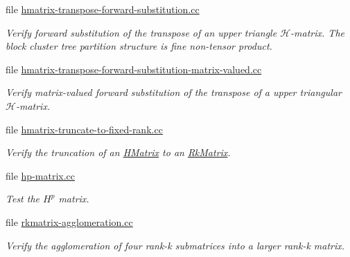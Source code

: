 \begin{DoxyCompactItemize}
file \hyperlink{hmatrix-transpose-forward-substitution_8cc}{hmatrix-\/transpose-\/forward-\/substitution.\+cc}
\begin{DoxyCompactList}\small\item\em Verify forward substitution of the transpose of an upper triangle $\mathcal{H}$-\/matrix. The block cluster tree partition structure is fine non-\/tensor product. \end{DoxyCompactList}\item 
file \hyperlink{hmatrix-transpose-forward-substitution-matrix-valued_8cc}{hmatrix-\/transpose-\/forward-\/substitution-\/matrix-\/valued.\+cc}
\begin{DoxyCompactList}\small\item\em Verify matrix-\/valued forward substitution of the transpose of a upper triangular $\mathcal{H}$-\/matrix. \end{DoxyCompactList}\item 
file \hyperlink{hmatrix-truncate-to-fixed-rank_8cc}{hmatrix-\/truncate-\/to-\/fixed-\/rank.\+cc}
\begin{DoxyCompactList}\small\item\em Verify the truncation of an \hyperlink{classHMatrix}{H\+Matrix} to an \hyperlink{classRkMatrix}{Rk\+Matrix}. \end{DoxyCompactList}\item 
file \hyperlink{hp-matrix_8cc}{hp-\/matrix.\+cc}
\begin{DoxyCompactList}\small\item\em Test the $H^p$ matrix. \end{DoxyCompactList}\item 
file \hyperlink{rkmatrix-agglomeration_8cc}{rkmatrix-\/agglomeration.\+cc}
\begin{DoxyCompactList}\small\item\em Verify the agglomeration of four rank-\/k submatrices into a larger rank-\/k matrix. \end{DoxyCompactList}\end{DoxyCompactItemize}

